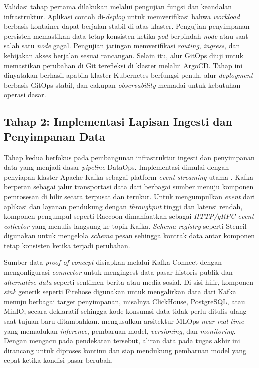 Validasi tahap pertama dilakukan melalui pengujian fungsi dan keandalan infrastruktur. Aplikasi contoh di-\textit{deploy} untuk memverifikasi bahwa \textit{workload} berbasis kontainer dapat berjalan stabil di atas klaster. Pengujian penyimpanan persisten memastikan data tetap konsisten ketika \textit{pod} berpindah \textit{node} atau saat salah satu \textit{node} gagal. Pengujian jaringan memverifikasi \textit{routing}, \textit{ingress}, dan kebijakan akses berjalan sesuai rancangan. Selain itu, alur GitOps diuji untuk memastikan perubahan di Git terefleksi di klaster melalui ArgoCD. Tahap ini dinyatakan berhasil apabila klaster Kubernetes berfungsi penuh, alur \textit{deployment} berbasis GitOps stabil, dan cakupan \textit{observability} memadai untuk kebutuhan operasi dasar.

\subsection{Tahap 2: Implementasi Lapisan Ingesti dan Penyimpanan Data}

Tahap kedua berfokus pada pembangunan infrastruktur ingesti dan penyimpanan data yang menjadi dasar \textit{pipeline} DataOps. Implementasi dimulai dengan penyiapan klaster Apache Kafka sebagai platform \textit{event streaming} utama \parencite{apachekafka2024}. Kafka berperan sebagai jalur transportasi data dari berbagai sumber menuju komponen pemrosesan di hilir secara terpusat dan terukur. Untuk mengumpulkan \textit{event} dari aplikasi dan layanan pendukung dengan \textit{throughput} tinggi dan latensi rendah, komponen pengumpul seperti Raccoon dimanfaatkan sebagai \textit{HTTP/gRPC event collector} yang menulis langsung ke topik Kafka. \textit{Schema registry} seperti Stencil digunakan untuk mengelola \textit{schema} pesan sehingga kontrak data antar komponen tetap konsisten ketika terjadi perubahan.

Sumber data \textit{proof-of-concept} disiapkan melalui Kafka Connect dengan mengonfigurasi \textit{connector} untuk mengingest data pasar historis publik dan \textit{alternative data} seperti sentimen berita atau media sosial. Di sisi hilir, komponen \textit{sink} generik seperti Firehose digunakan untuk mengalirkan data dari Kafka menuju berbagai target penyimpanan, misalnya ClickHouse, PostgreSQL, atau MinIO, secara deklaratif sehingga kode konsumsi data tidak perlu ditulis ulang saat tujuan baru ditambahkan. \textcite{rodrigues2025architecture} mengusulkan arsitektur MLOps \textit{near real-time} yang memadukan \textit{inference}, pembaruan model, \textit{versioning}, dan \textit{monitoring}. Dengan mengacu pada pendekatan tersebut, aliran data pada tugas akhir ini dirancang untuk diproses kontinu dan siap mendukung pembaruan model yang cepat ketika kondisi pasar berubah.

